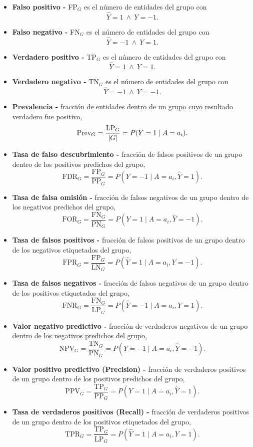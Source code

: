 \documentclass[oneside,openright,titlepage,numbers=noenddot,openany,headinclude,footinclude=true,
cleardoublepage=empty,abstractoff,BCOR=5mm,paper=a4,fontsize=12pt,main=spanish]{scrreprt}
\begin{document}
\begin{itemize} 
    \item \textbf{Falso positivo -} FP$_G$ es el número de entidades del grupo con $$\hat{Y} = 1 \ \wedge \ Y = -1.$$
    \item \textbf{Falso negativo -} FN$_G$ es el número de entidades del grupo con $$\hat{Y} = -1 \ \wedge \ Y = 1.$$
    \item \textbf{Verdadero positivo -} TP$_G$ es el número de entidades del grupo con $$\hat{Y} = 1 \ \wedge \ Y = 1.$$
    \item \textbf{Verdadero negativo -} TN$_G$ es el número de entidades del grupo con $$\hat{Y} = -1 \ \wedge \ Y = -1.$$
    \item \textbf{Prevalencia -}  fracción de entidades dentro de un grupo cuyo resultado verdadero fue positivo, $$\text{Prev}_G= \frac{\text{LP}_G}{\left\lvert G\right\rvert}=P(Y=1 \mid A=a_i).$$
    \item \textbf{Tasa de falso descubrimiento -} fracción de falsos positivos de un grupo dentro de los positivos predichos del grupo, $$\text{FDR}_G = \frac{\text{FP}_G}{\text{PP}_G} = P(Y=-1 \mid A=a_i,\hat{Y}=1).$$
    \item \textbf{Tasa de falsa omisión -} fracción de falsos negativos de un grupo dentro de los negativos predichos del grupo, $$\text{FOR}_G = \frac{\text{FN}_G}{\text{PN}_G} = P(Y=1 \mid A=a_i, \hat{Y}=-1).$$
    \item \textbf{Tasa de falsos positivos -} fracción de falsos positivos de un grupo dentro de los negativos etiquetados del grupo, $$\text{FPR}_G = \frac{\text{FP}_G}{\text{LN}_G} = P(\hat{Y}=1 \mid A=a_i,Y=-1).$$
    \item \textbf{Tasa de falsos negativos -} fracción de falsos negativos de un grupo dentro de los positivos etiquetados del grupo, $$\text{FNR}_G = \frac{\text{FN}_G}{\text{LP}_G} = P(\hat{Y}=-1 \mid A=a_i,Y=1).$$
    \item \textbf{Valor negativo predictivo -} fracción de verdaderos negativos de un grupo dentro de los negativos predichos del grupo, $$\text{NPV}_G = \frac{\text{TN}_G}{\text{PN}_G} = P(Y=-1 \mid A=a_i,\hat{Y}=-1).$$
    \item \textbf{Valor positivo predictivo (Precision) -} fracción de verdaderos positivos de un grupo dentro de los positivos predichos del grupo, $$\text{PPV}_G = \frac{\text{TP}_G}{\text{PP}_G} = P(Y=1 \mid A=a_i,\hat{Y}=1).$$
    \item \textbf{Tasa de verdaderos positivos (Recall) -} fracción de verdaderos positivos de un grupo dentro de los positivos etiquetados del grupo, $$\text{TPR}_G = \frac{\text{TP}_G}{\text{LP}_G} = P(\hat{Y}=1 \mid A=a_i,Y=1).$$

\end{itemize}
\end{document}
